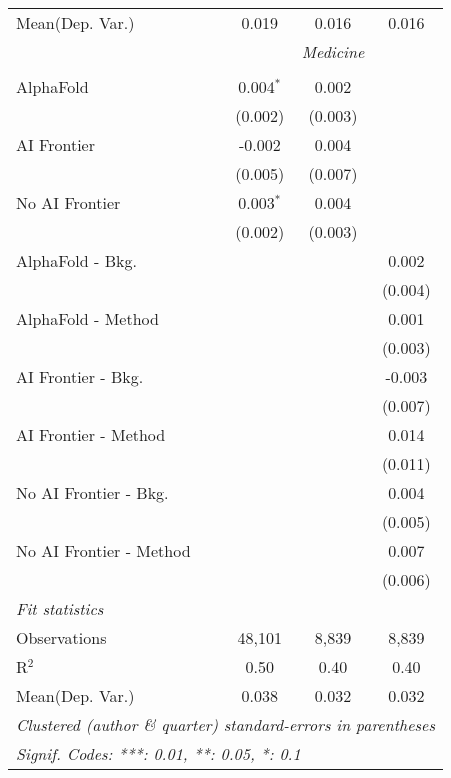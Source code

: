 \begin{tabular}{lccc}
Mean(Dep. Var.) & 0.019 & 0.016 & 0.016 \\
 & \multicolumn{3}{c}{\textit{Medicine}} \\ \\
   AlphaFold               & 0.004$^{*}$ & 0.002   &   \\   
                           & (0.002)     & (0.003) &   \\   
   AI Frontier             & -0.002      & 0.004   &   \\   
                           & (0.005)     & (0.007) &   \\   
   No AI Frontier          & 0.003$^{*}$ & 0.004   &   \\   
                           & (0.002)     & (0.003) &   \\   
   AlphaFold - Bkg.        &             &         & 0.002\\   
                           &             &         & (0.004)\\   
   AlphaFold - Method      &             &         & 0.001\\   
                           &             &         & (0.003)\\   
   AI Frontier - Bkg.      &             &         & -0.003\\   
                           &             &         & (0.007)\\   
   AI Frontier - Method    &             &         & 0.014\\   
                           &             &         & (0.011)\\   
   No AI Frontier - Bkg.   &             &         & 0.004\\   
                           &             &         & (0.005)\\   
   No AI Frontier - Method &             &         & 0.007\\   
                           &             &         & (0.006)\\   
   \midrule
   \emph{Fit statistics}\\
   Observations            & 48,101      & 8,839   & 8,839\\  
   R$^2$                   & 0.50        & 0.40    & 0.40\\  
Mean(Dep. Var.) & 0.038 & 0.032 & 0.032 \\
   \midrule \midrule
   \multicolumn{4}{l}{\emph{Clustered (author \& quarter) standard-errors in parentheses}}\\
   \multicolumn{4}{l}{\emph{Signif. Codes: ***: 0.01, **: 0.05, *: 0.1}}\\
\end{tabular}
\par\endgroup
